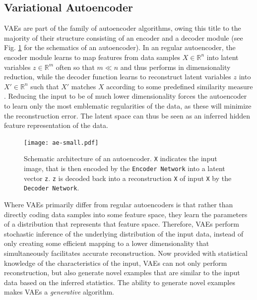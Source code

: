 \documentclass[twocolumn]{article}
\begin{document}

\hypertarget{vae}{%
\subsection{Variational Autoencoder}\label{vae}}

VAEs \citep{kingma2013auto} are part of the family of autoencoder algorithms, owing this title
to the majority of their structure consisting of an encoder and a
decoder module \citep{doersch2016tutorial} (see Fig. \ref{fig:ae} for the
schematics of an autoencoder). In an regular autoencoder, the encoder
module learns to map features from data samples \(X \in \mathbb{R}^{n}\)
into latent variables \(z \in \mathbb{R}^{m}\) often so that \(m \ll n\)
and thus performs in dimensionality reduction, while the decoder
function learns to reconstruct latent variables \(z\) into
\(X' \in \mathbb{R}^{n}\) such that \(X'\) matches \(X\) according to
some predefined similarity measure \citep{liou2014autoencoder}. Reducing
the input to be of much lower dimensionality forces the autoencoder to
learn only the most emblematic regularities of the data, as these will
minimize the reconstruction error. The latent space can thus be seen as
an inferred hidden feature representation of the data.

\begin{figure}
\centering
\texttt{[image: ae-small.pdf]}
\caption{Schematic architecture of an autoencoder. \texttt{X} indicates the input image, that is then encoded by the \texttt{Encoder Network} into a latent vector \texttt{z}. \texttt{z} is decoded back into a reconstruction \texttt{X\textquotesingle} of input \texttt{X} by the \texttt{Decoder Network}.}
\label{fig:ae}
\end{figure}

Where VAEs primarily differ from regular autoencoders is that rather
than directly coding data samples into some feature space, they learn
the parameters of a distribution that represents that feature space.
Therefore, VAEs perform stochastic inference of the underlying
distribution of the input data, instead of only creating some efficient
mapping to a lower dimensionality that simultaneously facilitates
accurate reconstruction. Now provided with statistical knowledge of the
characteristics of the input, VAEs can not only perform reconstruction,
but also generate novel examples that are similar to the input data
based on the inferred statistics. The ability to generate novel examples
makes VAEs a \emph{generative} algorithm.
\end{document}
